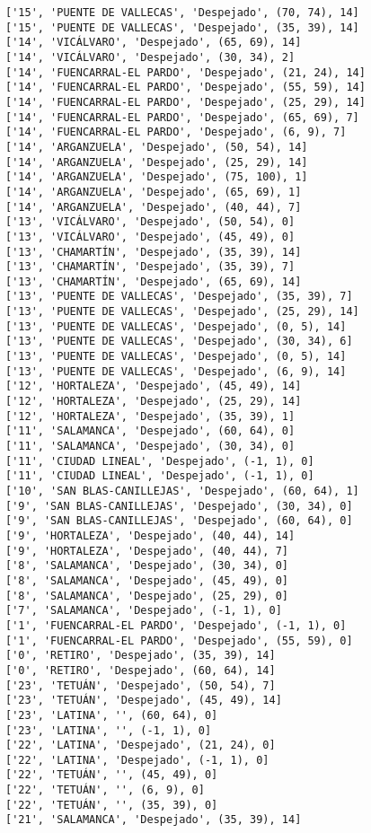 \documentclass[11pt]{article}
\begin{document}
\begin{Verbatim}[commandchars=\\\{\}]
['15', 'PUENTE DE VALLECAS', 'Despejado', (70, 74), 14]
['15', 'PUENTE DE VALLECAS', 'Despejado', (35, 39), 14]
['14', 'VICÁLVARO', 'Despejado', (65, 69), 14]
['14', 'VICÁLVARO', 'Despejado', (30, 34), 2]
['14', 'FUENCARRAL-EL PARDO', 'Despejado', (21, 24), 14]
['14', 'FUENCARRAL-EL PARDO', 'Despejado', (55, 59), 14]
['14', 'FUENCARRAL-EL PARDO', 'Despejado', (25, 29), 14]
['14', 'FUENCARRAL-EL PARDO', 'Despejado', (65, 69), 7]
['14', 'FUENCARRAL-EL PARDO', 'Despejado', (6, 9), 7]
['14', 'ARGANZUELA', 'Despejado', (50, 54), 14]
['14', 'ARGANZUELA', 'Despejado', (25, 29), 14]
['14', 'ARGANZUELA', 'Despejado', (75, 100), 1]
['14', 'ARGANZUELA', 'Despejado', (65, 69), 1]
['14', 'ARGANZUELA', 'Despejado', (40, 44), 7]
['13', 'VICÁLVARO', 'Despejado', (50, 54), 0]
['13', 'VICÁLVARO', 'Despejado', (45, 49), 0]
['13', 'CHAMARTÍN', 'Despejado', (35, 39), 14]
['13', 'CHAMARTÍN', 'Despejado', (35, 39), 7]
['13', 'CHAMARTÍN', 'Despejado', (65, 69), 14]
['13', 'PUENTE DE VALLECAS', 'Despejado', (35, 39), 7]
['13', 'PUENTE DE VALLECAS', 'Despejado', (25, 29), 14]
['13', 'PUENTE DE VALLECAS', 'Despejado', (0, 5), 14]
['13', 'PUENTE DE VALLECAS', 'Despejado', (30, 34), 6]
['13', 'PUENTE DE VALLECAS', 'Despejado', (0, 5), 14]
['13', 'PUENTE DE VALLECAS', 'Despejado', (6, 9), 14]
['12', 'HORTALEZA', 'Despejado', (45, 49), 14]
['12', 'HORTALEZA', 'Despejado', (25, 29), 14]
['12', 'HORTALEZA', 'Despejado', (35, 39), 1]
['11', 'SALAMANCA', 'Despejado', (60, 64), 0]
['11', 'SALAMANCA', 'Despejado', (30, 34), 0]
['11', 'CIUDAD LINEAL', 'Despejado', (-1, 1), 0]
['11', 'CIUDAD LINEAL', 'Despejado', (-1, 1), 0]
['10', 'SAN BLAS-CANILLEJAS', 'Despejado', (60, 64), 1]
['9', 'SAN BLAS-CANILLEJAS', 'Despejado', (30, 34), 0]
['9', 'SAN BLAS-CANILLEJAS', 'Despejado', (60, 64), 0]
['9', 'HORTALEZA', 'Despejado', (40, 44), 14]
['9', 'HORTALEZA', 'Despejado', (40, 44), 7]
['8', 'SALAMANCA', 'Despejado', (30, 34), 0]
['8', 'SALAMANCA', 'Despejado', (45, 49), 0]
['8', 'SALAMANCA', 'Despejado', (25, 29), 0]
['7', 'SALAMANCA', 'Despejado', (-1, 1), 0]
['1', 'FUENCARRAL-EL PARDO', 'Despejado', (-1, 1), 0]
['1', 'FUENCARRAL-EL PARDO', 'Despejado', (55, 59), 0]
['0', 'RETIRO', 'Despejado', (35, 39), 14]
['0', 'RETIRO', 'Despejado', (60, 64), 14]
['23', 'TETUÁN', 'Despejado', (50, 54), 7]
['23', 'TETUÁN', 'Despejado', (45, 49), 14]
['23', 'LATINA', '', (60, 64), 0]
['23', 'LATINA', '', (-1, 1), 0]
['22', 'LATINA', 'Despejado', (21, 24), 0]
['22', 'LATINA', 'Despejado', (-1, 1), 0]
['22', 'TETUÁN', '', (45, 49), 0]
['22', 'TETUÁN', '', (6, 9), 0]
['22', 'TETUÁN', '', (35, 39), 0]
['21', 'SALAMANCA', 'Despejado', (35, 39), 14]

\end{Verbatim}
\end{document}
